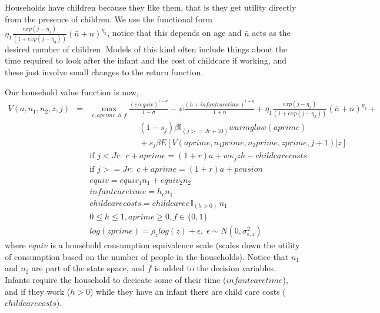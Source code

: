 Households have children because they like them, that is they get utility directly from the presence of children. We use the functional form $\eta_1 \frac{exp(j-\eta_3)}{(1+exp(j-\eta_3))} (\bar{n} + n)^{\eta_2}$, notice that this depends on age and $\bar{n}$ acts as the desired number of children. Models of this kind often include things about the time required to look after the infant and the cost of childcare if working, and these just involve small changes to the return function.

Our household value function is now,
\begin{eqnarray*}
 V(a,n_1,n_2,z,j)&=& \max_{c,aprime,h,f} \frac{(c/equiv)^{1-\sigma}}{1-\sigma} - \psi \frac{(h+infantcaretime)^{1+\eta}}{1+\eta} + \eta_1 \frac{exp(j-\eta_3)}{(1+exp(j-\eta_3))} (\bar{n} + n)^{\eta_2} + \\
 && \quad \quad \quad \quad \quad \quad (1-s_j)\beta  \mathbb{I}_{(j>=Jr+10)} warmglow(aprime)    \\
 && \quad \quad \quad \quad \quad \quad  + s_j \beta E[V(aprime,n_1 prime, n_2 prime, zprime,j+1)|z] \\
&& \text{if }j<Jr: \; c+aprime=(1+r)a+w \kappa_j z h-childcarecosts \\
&& \text{if }j>=Jr: \; c+aprime=(1+r)a +pension \\
&& equiv=equiv_1 n_1+equiv_2 n_2 \\
&& infantcaretime=h_c n_1 \\
&& childcarecosts=childcarec \, \mathbb{I}_{(h>0)} \, n_1  \\
&& 0\leq h \leq 1, aprime\geq 0, f\in\{0,1\} \\
&& log(zprime)=\rho_z log(z) + \epsilon, \; \epsilon \sim N(0,\sigma_{\epsilon,z}^2)
\end{eqnarray*}
where $equiv$ is a household consumption equivalence scale (scales down the utility of consumption based on the number of people in the households). Notice that $n_1$ and $n_2$ are part of the state space, and $f$ is added to the decision variables. Infants require the household to decicate some of their time ($infantcaretime$), and if they work ($h>0$) while they have an infant there are child care costs ($childcarecosts$).

